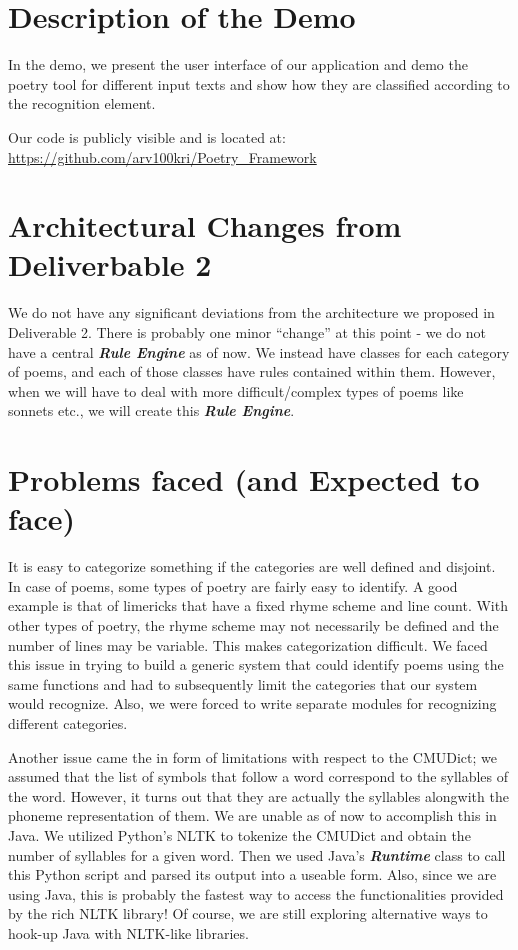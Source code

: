 \documentclass[10pt, letter]{article}
\begin{document}
\section*{Description of the Demo}
In the demo, we present the user interface of our application and demo the poetry tool for different input texts and show how they are classified according to the recognition element.

Our code is publicly visible and is located at: \url{https://github.com/arv100kri/Poetry_Framework}

\section*{Architectural Changes from Deliverbable 2}

We do not have any significant deviations from the architecture we proposed in Deliverable 2. There is probably one minor “change” at this point - we do not have a central \textbf{\textit{Rule Engine}} as of now. We instead have classes for each category of poems, and each of those classes have rules contained within them. However, when we will have to deal with more difficult/complex types of poems like sonnets etc., we will create this \textbf{\textit{Rule Engine}}.

\section*{Problems faced (and Expected to face)}

It is easy to categorize something if the categories are well defined and disjoint. In case of poems, some types of poetry are fairly easy to identify. A good example is that of limericks that have a fixed rhyme scheme and line count. With other types of poetry, the rhyme scheme may not necessarily be defined and the number of lines may be variable. This makes categorization difficult. We faced this issue in trying to build a generic system that could identify poems using the same functions and had to subsequently limit the categories that our system would recognize. Also, we were forced to write separate modules for recognizing different categories.

Another issue came the in form of limitations with respect to the CMUDict; we assumed that the list of symbols that follow a word correspond to the syllables of the word. However, it turns out that they are actually the syllables alongwith the phoneme representation of them. We are unable as of now to accomplish this in Java. We utilized Python’s NLTK to tokenize the CMUDict and obtain the number of syllables for a given word. Then we used Java’s \textbf{\textit{Runtime}} class to call this Python script and parsed its output into a useable form. Also, since we are using Java, this is probably the fastest way to access the functionalities provided by the rich NLTK library! Of course, we are still exploring alternative ways to hook-up Java with NLTK-like libraries.
\end{document}
